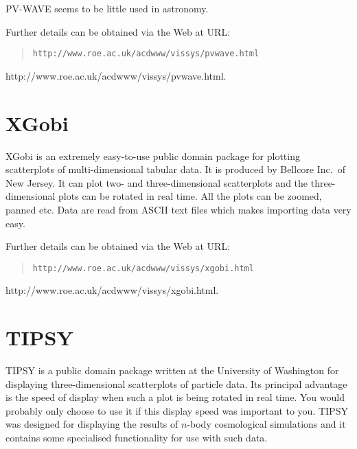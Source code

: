 PV-WAVE seems to be little used in astronomy.
\begin{latex}
Further details can be obtained via the Web at URL:

\begin{quote}
{\tt http://www.roe.ac.uk/acdwww/vissys/pvwave.html}
\end{quote}
\end{latex}

\begin{htmlonly}

{http://www.roe.ac.uk/acdwww/vissys/pvwave.html}.
\end{htmlonly}


\section{XGobi \label{XGOBI}  }

XGobi is an extremely easy-to-use public domain package for plotting
scatterplots of multi-dimensional tabular data. It is produced by
Bellcore Inc.\ of New Jersey. It can plot two- and three-dimensional
scatterplots and the three-dimensional plots can be rotated in real time.
All the plots can be zoomed, panned etc. Data are read from ASCII text
files which makes importing data very easy.

\begin{latex}
Further details can be obtained via the Web at URL:

\begin{quote}
{\tt http://www.roe.ac.uk/acdwww/vissys/xgobi.html}
\end{quote}
\end{latex}

\begin{htmlonly}
{http://www.roe.ac.uk/acdwww/vissys/xgobi.html}.
\end{htmlonly}


\section{TIPSY \label{TIPSY}  }

TIPSY is a public domain package written at the University of
Washington for displaying three-dimensional scatterplots of particle
data. Its principal advantage is the speed of display when such a
plot is being rotated in real time. You would probably only choose to
use it if this display speed was important to you. TIPSY was designed
for displaying the results of $n$-body cosmological simulations and it
contains some specialised functionality for use with such data.

